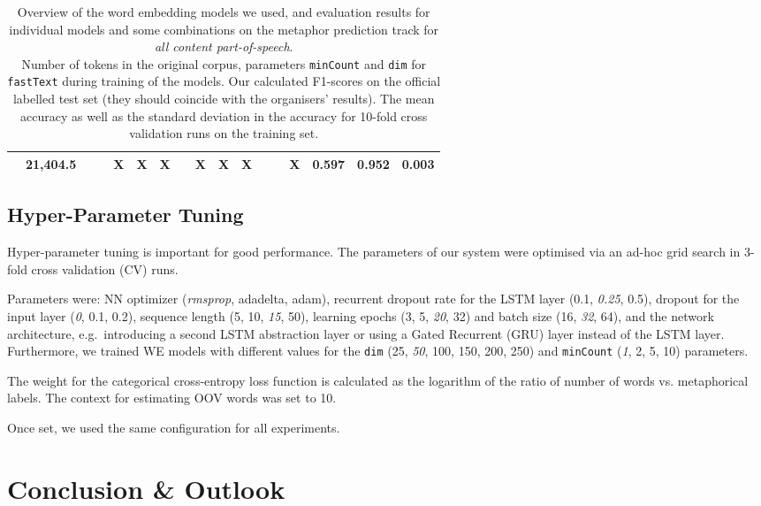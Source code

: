 \documentclass[11pt,a4paper]{article}
\newcommand\fT{\texttt{fastText}\xspace}
\begin{document}
\begin{table*}[t]
\begin{center}
\begin{tabular}{|l|S[table-format=6.1]|r|r||c|c|c|c|c|c|c|c|c|c||r|rr|}
    & 21,404.5  &  &   & X  & X & X  &  & X  & X & X &  &  & X & 0.597  & 0.952 & 0.003   \\
\hline
\end{tabular}
\end{center}
\caption{\label{tab:models}Overview of the word embedding models we used, and evaluation results for individual models and some combinations on the metaphor prediction track for \emph{all content part-of-speech}. \\ Number of tokens in the original corpus, parameters \texttt{minCount} and \texttt{dim} for \fT during training of the models. Our calculated F1-scores on the official labelled test set (they should coincide with the organisers' results). 
The mean accuracy as well as the standard deviation in the accuracy
for 10-fold cross validation runs on the training set.} 
\end{table*}


\subsection{Hyper-Parameter Tuning} %
Hyper-parameter tuning is important for good performance. The parameters of our system were optimised via an ad-hoc grid search in 3-fold cross validation (CV) runs.

Parameters were:
NN optimizer (\emph{rmsprop}, adadelta, adam), recurrent dropout rate for the LSTM layer (0.1, \emph{0.25}, 0.5), dropout for the input layer (\emph{0}, 0.1, 0.2), sequence length (5, 10, \emph{15}, 50), learning epochs (3, 5, \emph{20}, 32) and batch size (16, \emph{32}, 64), and the network architecture, e.g.~introducing a second LSTM abstraction layer or using a Gated Recurrent (GRU) layer instead of the LSTM layer.
Furthermore, we trained WE models with different values for the \texttt{dim} (25, \emph{50}, 100, 150, 200, 250) and \texttt{minCount} (\emph{1}, 2, 5, 10) parameters.

The weight for the categorical cross-entropy loss function is calculated as the logarithm of the ratio of number of words vs. metaphorical labels. The context for estimating OOV words was set to 10.

Once set, we used the same configuration for all experiments.


\section{Conclusion \& Outlook} %
\label{sec:conclusion}
\end{document}
